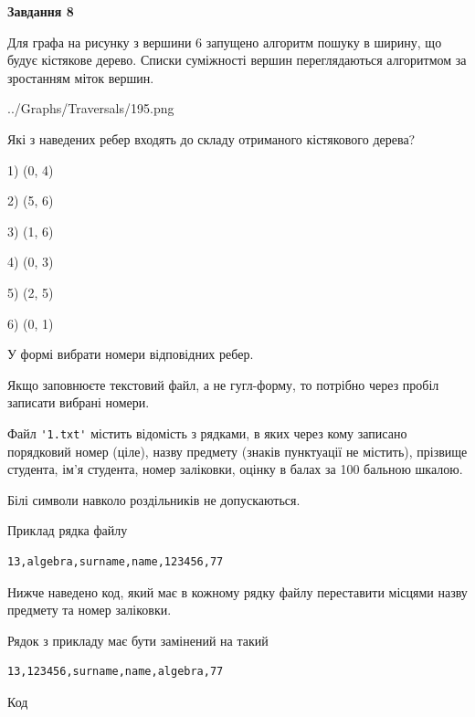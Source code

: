 \documentclass[12pt, ukrainian]{article}
\def\code#1{\Verb!#1!}
\begin{document}
{\begin {large}
{\begin {center}\textbf{Завдання 8}\end {center}}\par
Для графа на рисунку з вершини 6 запущено алгоритм пошуку в ширину, що будує кістякове дерево. Списки суміжності вершин переглядаються алгоритмом за зростанням міток вершин.\par
\begin{center}
	{../Graphs/Traversals/195.png}
\end{center}
\par Які з наведених ребер входять до складу отриманого кістякового дерева?\par
1) (0, 4)\par
2) (5, 6)\par
3) (1, 6)\par
4) (0, 3)\par
5) (2, 5)\par
6) (0, 1)\par
{\vskip 15pt} У формі вибрати номери відповідних ребер.


Якщо заповнюєте текстовий файл, а не гугл-форму, то потрібно через пробіл записа\-ти вибрані номери.\par
\newpage


Файл \code{'1.txt'} містить відомість з рядками, в яких через кому записано поряд\-ковий номер (ціле), назву предмету (знаків пунктуації не містить), прізвище студента, ім'я студента, номер заліковки, оцінку в балах за 100 бальною шкалою.

Білі символи навколо роздільників не допускаються.

Приклад рядка файлу



\begin{verbatim}
13,algebra,surname,name,123456,77
\end{verbatim}


Нижче наведено код, який має в кожному рядку файлу переставити місцями назву предмету та номер заліковки.

Рядок з прикладу має бути замінений на такий



\begin{verbatim}
13,123456,surname,name,algebra,77
\end{verbatim}




Код




\end{large}}
\end{document}
